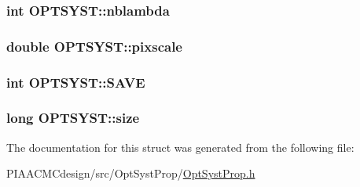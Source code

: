 \hypertarget{structOPTSYST_a984f1bc6e335c6ca935a7a4abc960351}{
\subsubsection[{nblambda}]{\setlength{\rightskip}{0pt plus 5cm}int O\+P\+T\+S\+Y\+S\+T\+::nblambda}}\label{structOPTSYST_a984f1bc6e335c6ca935a7a4abc960351}
\hypertarget{structOPTSYST_aa64373d953735e7fc898f664706ae434}{
\subsubsection[{pixscale}]{\setlength{\rightskip}{0pt plus 5cm}double O\+P\+T\+S\+Y\+S\+T\+::pixscale}}\label{structOPTSYST_aa64373d953735e7fc898f664706ae434}
\hypertarget{structOPTSYST_a1edeacc3267a9dae94f74a7ae2d5d668}{
\subsubsection[{S\+A\+V\+E}]{\setlength{\rightskip}{0pt plus 5cm}int O\+P\+T\+S\+Y\+S\+T\+::\+S\+A\+V\+E}}\label{structOPTSYST_a1edeacc3267a9dae94f74a7ae2d5d668}
\hypertarget{structOPTSYST_a1ca7a42369dc6bf1567dbeb3028c8a2a}{
\subsubsection[{size}]{\setlength{\rightskip}{0pt plus 5cm}long O\+P\+T\+S\+Y\+S\+T\+::size}}\label{structOPTSYST_a1ca7a42369dc6bf1567dbeb3028c8a2a}


The documentation for this struct was generated from the following file\+:\begin{DoxyCompactItemize}
\item 
P\+I\+A\+A\+C\+M\+Cdesign/src/\+Opt\+Syst\+Prop/\hyperlink{PIAACMCdesign_2src_2OptSystProp_2OptSystProp_8h}{Opt\+Syst\+Prop.\+h}\end{DoxyCompactItemize}

